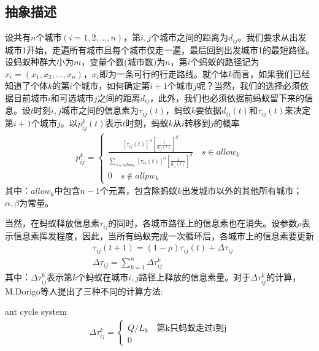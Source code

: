     \subsection{抽象描述}
        \par
        设共有$n$个城市$(i=1,2,\dots,n)$，第$i,j$个城市之间的距离为$d_{ij}$。我们要求从出发城市1开始，走遍所有城市且每个城市仅走一遍，最后回到出发城市1的最短路径。设蚂蚁种群大小为$m$，变量个数(城市数)为$n$，第$i$个蚂蚁的路径记为$x_i=(x_1,x_2,\dots,x_n)$，$x_i$即为一条可行的行走路线。就个体$k$而言，如果我们已经知道了个体$k$的第$i$个城市，如何确定第$i+1$个城市$j$呢？当然，我们的选择必须依据目前城市$i$和可选城市$j$之间的距离$d_{ij}$，此外，我们也必须依据前蚂蚁留下来的信息。设$t$时刻$i,j$城市之间的信息素为$\tau_{ij}(t)$，蚂蚁$k$要依据$d_{ij}(t)$和$\tau_{ij}(t)$来决定第$i+1$个城市$j$。以$p_{ij}^k(t)$表示$t$时刻，蚂蚁$k$从$i$转移到$j$的概率
        \begin{align*}
        p_{ij}^k = \left\{
        \begin{aligned}
        \frac{[\tau_{ij}(t)]^\alpha \left[\frac{1}{d_{ij}(t)}\right]^\beta}{\sum_{s\in allow_k}[\tau_{is}(t)]^\alpha \left[\frac{1}{d_{is}(t)}\right]^\beta} \quad s\in allow_k\\
        0 \quad s\notin allpw_k
        \end{aligned}
        \right.
        \end{align*}
        其中：$allow_k$中包含$n-1$个元素，包含除蚂蚁$k$出发城市以外的其他所有城市；$\alpha,\beta$为常量。
        \par
        当然，在蚂蚁释放信息素$\tau_{ij}$的同时，各城市路径上的信息素也在消失。设参数$\rho$表示信息素挥发程度，因此，当所有蚂蚁完成一次循环后，各城市上的信息素要更新
        \begin{align*}
        &  \tau_{ij}(t+1) = (1-\rho)\tau_{ij}(t)+\Delta \tau_{ij}\\
        &  \Delta\tau_{ij} = \sum_{k=1}^n\Delta\tau_{ij}^k
        \end{align*}
        其中：$\Delta\tau_{ij}^k$表示第$k$个蚂蚁在城市$i,j$路径上释放的信息素量。对于$\Delta\tau_{ij}^k$的计算，M.Dorigo等人提出了三种不同的计算方法:
        \par
        ant cycle system
        \begin{align*}
        \Delta\tau_{ij}^k = \left\{
        \begin{aligned}
        Q/L_k \quad \text{第k只蚂蚁走过i到j}\\
        0
        \end{aligned}
        \right.
        \end{align*}
